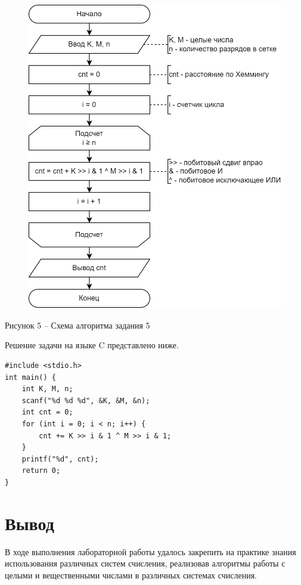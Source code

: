 \documentclass[a4paper,14pt]{extarticle}
\begin{document}
	\begin{figure}[h]
		\centering
		\includegraphics[width=0.6\linewidth]{schemes/s-5}
	\end{figure}
	\begin{center}
		Рисунок 5 – Схема алгоритма задания 5
	\end{center}
	
	Решение задачи на языке C представлено ниже.
	
	\begin{lstlisting}[tabsize=2,basicstyle=\ttfamily]
#include <stdio.h>
int main() {
	int K, M, n;
	scanf("%d %d %d", &K, &M, &n);
	int cnt = 0;
	for (int i = 0; i < n; i++) {
		cnt += K >> i & 1 ^ M >> i & 1;
	}
	printf("%d", cnt);
	return 0;
}
	\end{lstlisting}
	
	\section*{Вывод}
	В ходе выполнения лабораторной работы удалось закрепить на практике знания использования различных систем счисления, реализовав алгоритмы работы с целыми и вещественными числами в различных системах счисления.
	
\end{document}

